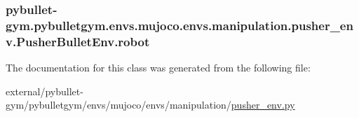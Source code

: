 \subsubsection[{\texorpdfstring{robot}{robot}}]{\setlength{\rightskip}{0pt plus 5cm}pybullet-\/gym.\+pybulletgym.\+envs.\+mujoco.\+envs.\+manipulation.\+pusher\+\_\+env.\+Pusher\+Bullet\+Env.\+robot}\hypertarget{classpybullet-gym_1_1pybulletgym_1_1envs_1_1mujoco_1_1envs_1_1manipulation_1_1pusher__env_1_1_pusher_bullet_env_a591e8e6bb23513d420d65843308231b1}{}\label{classpybullet-gym_1_1pybulletgym_1_1envs_1_1mujoco_1_1envs_1_1manipulation_1_1pusher__env_1_1_pusher_bullet_env_a591e8e6bb23513d420d65843308231b1}


The documentation for this class was generated from the following file\+:\begin{DoxyCompactItemize}
\item 
external/pybullet-\/gym/pybulletgym/envs/mujoco/envs/manipulation/\hyperlink{mujoco_2envs_2manipulation_2pusher__env_8py}{pusher\+\_\+env.\+py}\end{DoxyCompactItemize}
